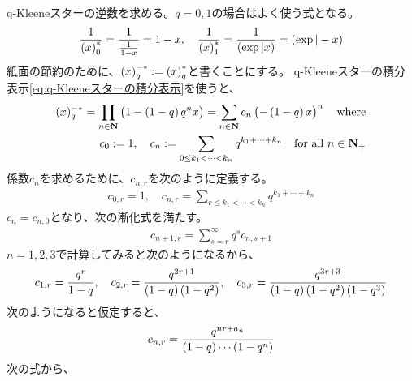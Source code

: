{	q-Kleeneスターの逆数を求める。$q=0,1$の場合はよく使う式となる。
	\begin{equation*}\begin{split}
		\frac{1}{\mathinner{\left({x}\right)}_0^*} = \frac{1}{\frac{1}{1 - x}} = 1 - x
		,\quad \frac{1}{\mathinner{\left({x}\right)}_1^*} = \frac{1}{\mathinner{\left({\exp|x}\right)}} = \mathinner{\left({\exp|-x}\right)}
	\end{split}\end{equation*}
	紙面の節約のために、$\mathinner{\left({x}\right)}_q^{-*}:=\mathinner{\left({x}\right)}_q^*$と書くことにする。
	q-Kleeneスターの積分表示\eqref{eq:q-Kleeneスターの積分表示}を使うと、
	\begin{equation*}\begin{split}
		(x)_q^{-*} = \prod_{n\in\mathbf{N}} \mathinner{\bigl({1 - \mathinner{\left({1 - q}\right)}q^nx}\bigr)}
		= \sum_{n\in\mathbf{N}} c_n\mathinner{\bigl({-\mathinner{\left({1 - q}\right)}x}\bigr)}^n \quad\text{where} \\
		c_0  := 1,\quad c_n := \sum_{0\le k_1<\cdots<k_n} q^{k_1 +\cdots+	k_n} 
			\quad\text{for all } n\in\mathbf{N}_+
	\end{split}\end{equation*}
	係数$c_n$を求めるために、$c_{n,r}$を次のように定義する。
	\begin{equation*}\begin{split}
		c_{0,r} = 1,\quad
		c_{n,r} = \sum_{r\le k_1<\cdots<k_n} q^{k_1 +\cdots+	k_n}
	\end{split}\end{equation*}
	$c_n=c_{n,0}$となり、次の漸化式を満たす。
	\begin{equation*}\begin{split}
		c_{n+1,r} = \sum_{s=r}^\infty q^sc_{n,s+1}
	\end{split}\end{equation*}
	$n=1,2,3$で計算してみると次のようになるから、
	\begin{equation*}\begin{split}
		c_{1,r} = \frac{q^r}{1 - q}
		,\quad c_{2,r} = \frac{q^{2r + 1}}{\mathinner{\left({1 - q}\right)}\mathinner{\left({1 - q^2}\right)}}
		,\quad c_{3,r} = \frac{q^{3r + 3}}{\mathinner{\left({1 - q}\right)}\mathinner{\left({1 - q^2}\right)}\mathinner{\left({1 - q^3}\right)}}
	\end{split}\end{equation*}
	次のようになると仮定すると、
	\begin{equation*}\begin{split}
		c_{n,r} = \frac{q^{nr + a_n}}{\mathinner{\left({1 - q}\right)}\cdots\mathinner{\left({1 - q^n}\right)}}
	\end{split}\end{equation*}
	次の式から、
	\begin{equation*}\begin{split}

\end{split}
\end{equation*}}
